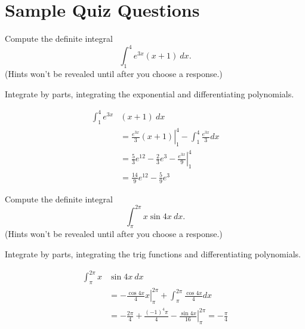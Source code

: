 \documentclass{ximera}
\begin{document}
\section*{Sample Quiz Questions}
\begin{question}%

Compute the definite integral 
\[\int_1^4 e^{3x} (x + 1) ~ dx.\]
(Hints won't be revealed until after you choose a response.)
\begin{multiplechoice}
\end{multiplechoice}
\begin{feedback}
Integrate by parts, integrating the exponential and differentiating polynomials.
\begin{hint}
\[\begin{aligned}
    \int_1^4 e^{3x} &  (x + 1) ~ dx \\
    & = \left. \frac{e^{3x}}{3} (x+1) \right|_1^4 - \int_1^4 \frac{e^{3x}}{3} dx \\
    & = \frac{5}{3} e^{12} - \frac{2}{3} e^{3} - \left. \frac{e^{3x}}{9} \right|_1^4 \\
    & = \frac{14}{9} e^{12} - \frac{5}{9} e^{3}
\end{aligned}\]
\end{hint}
\end{feedback}

\end{question}
\begin{question}%

Compute the definite integral 
\[\int_{\pi}^{2 \pi} x \sin 4 x ~ dx.\]
(Hints won't be revealed until after you choose a response.)
\begin{multiplechoice}
\end{multiplechoice}
\begin{feedback}
Integrate by parts, integrating the trig functions and differentiating polynomials.
\begin{hint}
\[ \begin{aligned}
    \int_{\pi}^{2 \pi} x & \sin 4 x ~ dx \\
    & = \left. - \frac{\cos 4x}{4} x \right|_{\pi}^{2 \pi} + \int_{\pi}^{2 \pi} \frac{\cos 4x}{4} dx \\
    & = - \frac{2 \pi }{4} + \frac{(-1)^{4} \pi }{4} - \left. \frac{\sin 4x}{16} \right|_{\pi}^{2 \pi} = -\frac{\pi}{4}
\end{aligned}\]
\end{hint}
\end{feedback}

\end{question}
\end{document}
